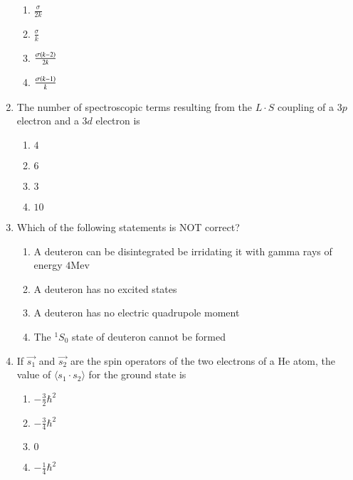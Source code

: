 \documentclass[journal]{IEEEtran}
\begin{document}
\begin{enumerate}
{\begin{multicols}{4}
\begin{enumerate}
\item $\frac{\sigma}{2k}$
\item $\frac{\sigma}{k}$
\item $\frac{\sigma\left(k-2\right)}{2k}$
\item $\frac{\sigma\left(k-1\right)}{k}$
\end{enumerate}
\end{multicols}
}
\item{
The number of spectroscopic terms resulting from the $L\cdot S$ coupling of a $3p$ electron and a $3d$ electron is
\begin{multicols}{4}
\begin{enumerate}
\item $4$
\item $6$
\item $3$
\item $10$
\end{enumerate}
\end{multicols}
}
\item{
Which of the following statements is NOT correct?
\begin{enumerate}
\item A deuteron can be disintegrated be irridating it with gamma rays of energy $4$Mev
\item A deuteron has no excited states
\item A deuteron has no electric quadrupole moment
\item The $^1S_0$ state of deuteron cannot be formed
\end{enumerate}
}
\item{
If $\overrightarrow{s_1}$ and $\overrightarrow{s_2}$ are the spin operators of the two electrons of a He atom, the value of $\langle s_1\cdot s_2 \rangle$ for the ground state is
\begin{multicols}{4}
\begin{enumerate}
    \item $-\frac{3}{2}\hbar^2$
    \item $-\frac{3}{4}\hbar^2$
    \item $0$
    \item $-\frac{1}{4}\hbar^2$
\end{enumerate}
\end{multicols}
}
\end{enumerate}
\end{document}
